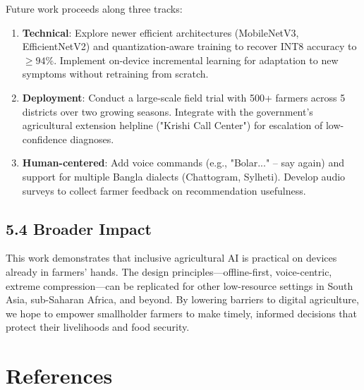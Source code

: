 \documentclass[12pt,letterpaper]{report}
\begin{document}
Future work proceeds along three tracks:
\begin{enumerate}
    \item \textbf{Technical}: Explore newer efficient architectures (MobileNetV3, EfficientNetV2) and quantization-aware training to recover INT8 accuracy to $\geq 94\%$. Implement on-device incremental learning for adaptation to new symptoms without retraining from scratch.
    \item \textbf{Deployment}: Conduct a large-scale field trial with 500+ farmers across 5 districts over two growing seasons. Integrate with the government's agricultural extension helpline ("Krishi Call Center") for escalation of low-confidence diagnoses.
    \item \textbf{Human-centered}: Add voice commands (e.g., "Bolar..." – say again) and support for multiple Bangla dialects (Chattogram, Sylheti). Develop audio surveys to collect farmer feedback on recommendation usefulness.
\end{enumerate}

\section*{5.4 Broader Impact}

This work demonstrates that inclusive agricultural AI is practical on devices already in farmers' hands. The design principles—offline-first, voice-centric, extreme compression—can be replicated for other low-resource settings in South Asia, sub-Saharan Africa, and beyond. By lowering barriers to digital agriculture, we hope to empower smallholder farmers to make timely, informed decisions that protect their livelihoods and food security.

\chapter*{References}

\renewcommand{\bibname}{}
\begingroup
\renewcommand{\chapter}[2]{}


\endgroup
\end{document}
